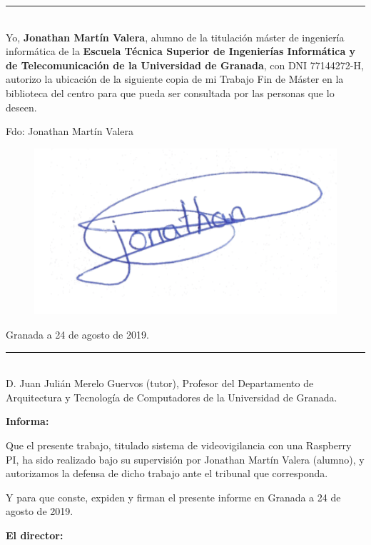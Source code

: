 \thispagestyle{empty}


\noindent\rule[-1ex]{\textwidth}{2pt}\\[4.5ex]

Yo, \textbf{Jonathan Martín Valera}, alumno de la titulación máster de ingeniería informática de la \textbf{Escuela Técnica Superior de Ingenierías Informática y de Telecomunicación de la Universidad de Granada}, con DNI 77144272-H, autorizo la ubicación de la siguiente copia de mi Trabajo Fin de Máster en la biblioteca del centro para que pueda ser consultada por las personas que lo deseen.

\vspace{0.5cm}

\noindent Fdo: Jonathan Martín Valera

\begin{figure}[h]
	\centering
	\includegraphics[scale=0.3]{images/firma}
\end{figure}

\begin{flushright}
Granada a 24 de agosto de 2019.
\end{flushright}


\newpage

\thispagestyle{empty}

\noindent\rule[-1ex]{\textwidth}{2pt}\\[4.5ex]

D. Juan Julián Merelo Guervos (tutor), Profesor del Departamento de Arquitectura y Tecnología de Computadores de la Universidad de Granada.

\textbf{Informa:}

Que el presente trabajo, titulado sistema de videovigilancia con una Raspberry PI, ha sido realizado bajo su supervisión por Jonathan Martín Valera (alumno), y autorizamos la defensa de dicho trabajo ante el tribunal que corresponda.

Y para que conste, expiden y firman el presente informe en Granada a 24 de agosto de 2019.


\textbf{El director:}
